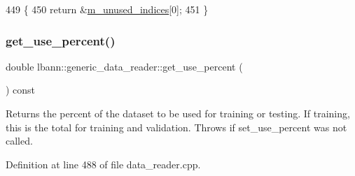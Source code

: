 \begin{DoxyCode}
449                          \{
450     \textcolor{keywordflow}{return} &\hyperlink{classlbann_1_1generic__data__reader_a0bc0ee42e95d23687ddcc30d6c338b19}{m\_unused\_indices}[0];
451   \}
\end{DoxyCode}
\mbox{\label{classlbann_1_1generic__data__reader_a5853fa5e619b886699954aca6440dd8a}} 
\subsubsection{\texorpdfstring{get\+\_\+use\+\_\+percent()}{get\_use\_percent()}}
{\footnotesize\ttfamily double lbann\+::generic\+\_\+data\+\_\+reader\+::get\+\_\+use\+\_\+percent (\begin{DoxyParamCaption}{ }\end{DoxyParamCaption}) const\hspace{0.3cm}{\ttfamily [protected]}}

Returns the percent of the dataset to be used for training or testing. If training, this is the total for training and validation. Throws if set\+\_\+use\+\_\+percent was not called. 

Definition at line 488 of file data\+\_\+reader.\+cpp.


